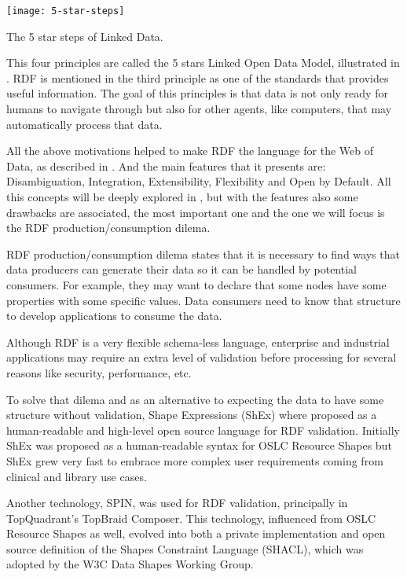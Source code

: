 \begin{marginfigure}
	\texttt{[image: 5-star-steps]}
	\caption[The 5 star steps of Linked Data]{The 5 star steps of Linked Data.}
\end{marginfigure}

This four principles are called the 5 stars Linked Open Data Model, illustrated in .
RDF is mentioned in the third principle as one of the standards that provides useful information. The goal of this principles is that data is not only ready for humans to navigate through but also for other agents, like computers, that may automatically process that data.

All the above motivations helped to make RDF the language for the Web of Data, as described in . And the main features that it presents are: Disambiguation, Integration, Extensibility, Flexibility and Open by Default. All this concepts will be deeply explored in , but with the features also some drawbacks are associated, the most important one and the one we will focus is the RDF production/consumption dilema.

RDF production/consumption dilema states that it is necessary to find ways that data producers can generate their data so it can be handled by potential consumers. For example, they may want to declare that some nodes have some properties with some specific values. Data consumers need to know that structure to develop applications to consume the data.

Although RDF is a very flexible schema-less language, enterprise and industrial applications may require an extra level of validation before processing for several reasons like security, performance, etc.

To solve that dilema and as an alternative to expecting the data to have some structure without validation, Shape Expressions (ShEx) where proposed as a human-readable and high-level open source language for RDF validation. Initially ShEx was proposed as a human-readable syntax for OSLC Resource Shapes  but ShEx grew very fast to embrace more complex user requirements coming from clinical and library use cases.

Another technology, SPIN, was used for RDF validation, principally in TopQuadrant’s TopBraid Composer. This technology, influenced from OSLC Resource Shapes as well, evolved into both a private implementation and open source definition of the Shapes Constraint Language (SHACL), which was adopted by the W3C Data Shapes Working Group.

